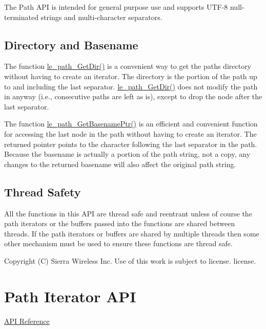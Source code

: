 The Path A\+P\+I is intended for general purpose use and supports U\+T\+F-\/8 null-\/terminated strings and multi-\/character separators.\hypertarget{c_path_c_path_dirAndBasename}{}\subsection{Directory and Basename}\label{c_path_c_path_dirAndBasename}
The function {\ttfamily \hyperlink{le__path_8h_a0b0ff4c06db44de9bf4f40b9f5388785}{le\+\_\+path\+\_\+\+Get\+Dir()}} is a convenient way to get the path\textquotesingle{}s directory without having to create an iterator. The directory is the portion of the path up to and including the last separator. \hyperlink{le__path_8h_a0b0ff4c06db44de9bf4f40b9f5388785}{le\+\_\+path\+\_\+\+Get\+Dir()} does not modify the path in anyway (i.\+e., consecutive paths are left as is), except to drop the node after the last separator.

The function \hyperlink{le__path_8h_aa58d208512dd5b9b2dc0ea6d5c963c25}{le\+\_\+path\+\_\+\+Get\+Basename\+Ptr()} is an efficient and convenient function for accessing the last node in the path without having to create an iterator. The returned pointer points to the character following the last separator in the path. Because the basename is actually a portion of the path string, not a copy, any changes to the returned basename will also affect the original path string.\hypertarget{c_path_c_path_threads}{}\subsection{Thread Safety}\label{c_path_c_path_threads}
All the functions in this A\+P\+I are thread safe and reentrant unless of course the path iterators or the buffers passed into the functions are shared between threads. If the path iterators or buffers are shared by multiple threads then some other mechanism must be used to ensure these functions are thread safe.





Copyright (C) Sierra Wireless Inc. Use of this work is subject to license. license. \hypertarget{c_pathIter}{}\section{Path Iterator A\+P\+I}\label{c_pathIter}
\hyperlink{le__path_iter_8h}{A\+P\+I Reference}





